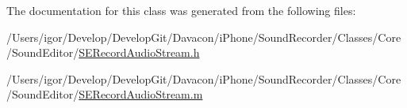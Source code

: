 The documentation for this class was generated from the following files\-:\begin{DoxyCompactItemize}
\item 
/\-Users/igor/\-Develop/\-Develop\-Git/\-Davacon/i\-Phone/\-Sound\-Recorder/\-Classes/\-Core/\-Sound\-Editor/\hyperlink{_s_e_record_audio_stream_8h}{S\-E\-Record\-Audio\-Stream.\-h}\item 
/\-Users/igor/\-Develop/\-Develop\-Git/\-Davacon/i\-Phone/\-Sound\-Recorder/\-Classes/\-Core/\-Sound\-Editor/\hyperlink{_s_e_record_audio_stream_8m}{S\-E\-Record\-Audio\-Stream.\-m}\end{DoxyCompactItemize}
